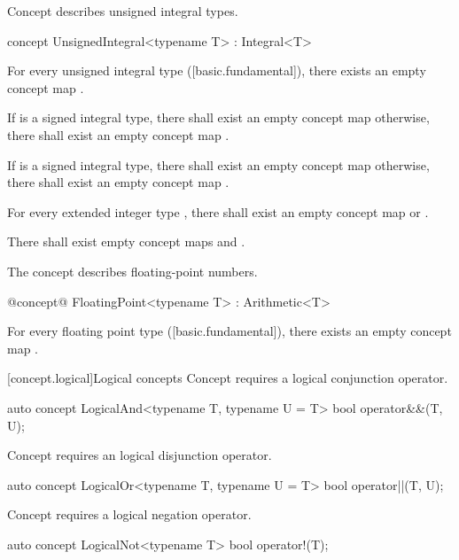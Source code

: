 \documentclass[american,twoside]{book}
\begin{document}
\pnum
Concept  describes unsigned integral types.

\begin{itemdecl}
concept UnsignedIntegral<typename T> : Integral<T> { }
\end{itemdecl}

\pnum
For every unsigned integral type  ([basic.fundamental]),
there exists an empty concept map .

\pnum
If  is a signed integral type, there shall exist an empty
concept map  otherwise, there shall exist
an empty concept map .

\pnum
If  is a signed integral type, there shall exist an empty
concept map  otherwise, there shall exist
an empty concept map .

\pnum 
For every extended integer type , there shall exist an empty
concept map  or .

\pnum
There shall exist empty concept maps
 and .

\pnum
The  concept describes floating-point numbers.

\begin{itemdecl}
@\textcolor{addclr}{concept}@ FloatingPoint<typename T> : Arithmetic<T> { }
\end{itemdecl}

\pnum
For every floating point type  ([basic.fundamental]), there
exists an empty concept map .

[concept.logical]{Logical concepts}
\pnum
Concept  requires a logical conjunction operator.
\begin{itemdecl}
auto concept LogicalAnd<typename T, typename U = T> {
  bool operator&&(T, U);
}
\end{itemdecl}

\pnum
Concept  requires an logical disjunction operator.
\begin{itemdecl}
auto concept LogicalOr<typename T, typename U = T> {
  bool operator||(T, U);
}
\end{itemdecl}

\pnum
Concept  requires a logical negation operator.
\begin{itemdecl}
auto concept LogicalNot<typename T> {
  bool operator!(T);
}
\end{itemdecl}
\end{document}

